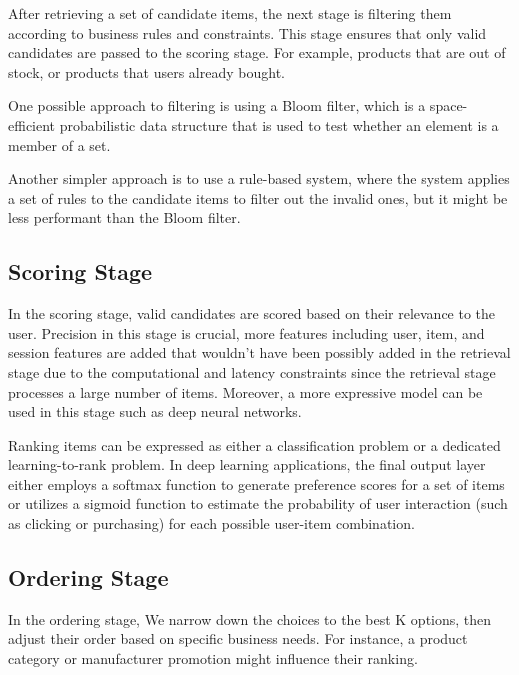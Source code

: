 After retrieving a set of candidate items, the next stage is filtering them according to business rules and constraints.
This stage ensures that only valid candidates are passed to the scoring stage.
For example, products that are out of stock, or products that users already bought.

One possible approach to filtering is using a Bloom filter, which is a space-efficient probabilistic data structure that is used to test whether an element is a member of a set.

Another simpler approach is to use a rule-based system, where the system applies a set of rules to the candidate items to filter out the invalid ones, but it might be less performant than the Bloom filter.


\subsection{Scoring Stage}

In the scoring stage, valid candidates are scored based on their relevance to the user. Precision in this stage is crucial, more features including user, item, and session features are added that wouldn't have been possibly added in the retrieval stage due to the computational and latency constraints since the retrieval stage processes a large number of items. Moreover, a more expressive model can be used in this stage such as deep neural networks. \cite{eugeneyan}

Ranking items can be expressed as either a classification problem or a dedicated learning-to-rank problem. In deep learning applications, the final output layer either employs a softmax function to generate preference scores for a set of items or utilizes a sigmoid function to estimate the probability of user interaction (such as clicking or purchasing) for each possible user-item combination. \cite{eugeneyan}

\subsection{Ordering Stage}
In the ordering stage, We narrow down the choices to the best K options, then adjust their order based on specific business needs. For instance, a product category or manufacturer promotion might influence their ranking. \cite{NvidiaRecSysBestPractices}

